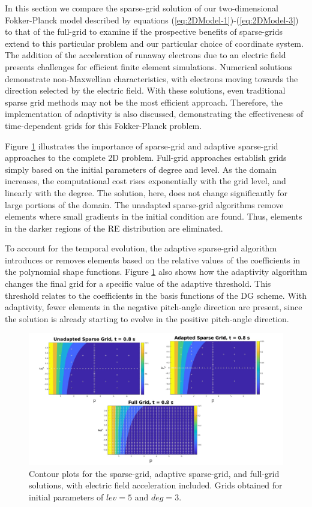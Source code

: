 \documentclass[preprint,11pt]{elsarticle}
\begin{document}
In this section we compare the sparse-grid solution of our two-dimensional Fokker-Planck model described by equations (\ref{eq:2DModel-1})-(\ref{eq:2DModel-3}) to that of the full-grid to examine if the prospective benefits of sparse-grids extend to this particular problem and our particular choice of coordinate system. The addition of the acceleration of runaway electrons due to an electric field presents challenges for efficient finite element simulations. Numerical solutions demonstrate non-Maxwellian characteristics, with electrons moving towards the direction selected by the electric field. With these solutions, even traditional sparse grid methods may not be the most efficient approach. Therefore, the implementation of adaptivity is also discussed, demonstrating the effectiveness of time-dependent grids for this Fokker-Planck problem. 

Figure \ref{fig:2DAdaptContour} illustrates the importance of sparse-grid and adaptive sparse-grid approaches to the complete 2D problem. Full-grid approaches establish grids simply based on the initial parameters of degree and level. As the domain increases, the computational cost rises exponentially with the grid level, and linearly with the degree. The solution, here, does not change significantly for large portions of the domain. The unadapted sparse-grid algorithms remove elements where small gradients in the initial condition are found. Thus, elements in the darker regions of the RE distribution are eliminated. 

To account for the temporal evolution, the adaptive sparse-grid algorithm introduces or removes elements based on the relative values of the coefficients in the polynomial shape functions. Figure \ref{fig:2DAdaptContour} also shows how the adaptivity algorithm changes the final grid for a specific value of the adaptive threshold. This threshold relates to the coefficients in the basis functions of the DG scheme. With adaptivity, fewer elements in the negative pitch-angle direction are present, since the solution is already starting to evolve in the positive pitch-angle direction. 

\begin{figure}[H]
    \centering
    \includegraphics[width=1.1\textwidth]{FIGURES/2DContour_AdaptSG.jpg}
    \caption{Contour plots for the sparse-grid, adaptive sparse-grid, and full-grid solutions, with electric field acceleration included. Grids obtained for initial parameters of $lev = 5$ and $deg = 3$.}
    \label{fig:2DAdaptContour}
\end{figure}
\end{document}
